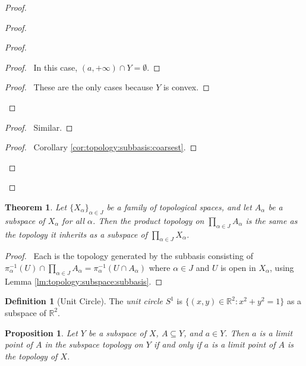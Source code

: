 \documentclass{report}
\let\qed\relax
\newtheorem{prop}[lm]{Proposition}
\newtheorem{thm}[lm]{Theorem}
\theoremstyle{definition}
\newtheorem{df}[lm]{Definition}
\begin{document}
\begin{proof}
\begin{proof}
\begin{proof}
        \begin{proof}
          \pf\ In this case, $(a, +\infty) \cap Y = \emptyset$.
        \end{proof}
        \qedstep
        \begin{proof}
          \pf\ These are the only cases because $Y$ is convex.
        \end{proof}
      \end{proof}
      \begin{proof}
        \pf\ Similar.
      \end{proof}
      \qedstep
      \begin{proof}
        \pf\ Corollary \ref{cor:topology:subbasis:coarsest}.
      \end{proof}
    \end{proof}
    \qed
  \end{proof}

  \begin{thm}
    Let $\{X_\alpha\}_{\alpha \in J}$ be a family of topological spaces, and
    let $A_\alpha$ be a subspace of $X_\alpha$ for all $\alpha$. Then the
    product
    topology on $\prod_{\alpha \in J} A_\alpha$ is the same as the topology it
    inherits as a subspace of $\prod_{\alpha \in J} X_\alpha$.
  \end{thm}

  \begin{proof}
    \pf\ Each is the topology generated by the subbasis consisting of
    $\pi_\alpha^{-1}(U) \cap \prod_{\alpha \in J} A_\alpha = \pi_\alpha^{-1}(U
    \cap A_\alpha)$ where $\alpha \in J$ and $U$ is open in $X_\alpha$, using
    Lemma
    \ref{lm:topology:subspace:subbasis}. \qed
  \end{proof}

  \begin{df}[Unit Circle]
    The \emph{unit circle} $S^1$ is $\{ (x,y) \in \mathbb{R}^2 : x^2 + y^2 = 1
    \}$ as a subspace of $\mathbb{R}^2$.
  \end{df}

  \begin{prop}
    \label{prop:topology:subspace:limit_point}
    Let $Y$ be a subspace of $X$, $A \subseteq Y$, and $a \in Y$. Then $a$ is a
    limit point of $A$ in the subspace topology on $Y$ if and only if $a$ is a
    limit point of $A$ is the topology of $X$.
  \end{prop}
\end{document}
